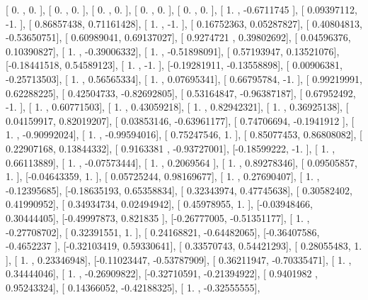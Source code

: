\documentclass{article}
\begin{document}
       [ 0.        ,  0.        ],
       [ 0.        ,  0.        ],
       [ 0.        ,  0.        ],
       [ 0.        ,  0.        ],
       [ 0.        ,  0.        ],
       [ 1.        , -0.6711745 ],
       [ 0.09397112, -1.        ],
       [ 0.86857438,  0.71161428],
       [ 1.        , -1.        ],
       [ 0.16752363,  0.05287827],
       [ 0.40804813, -0.53650751],
       [ 0.60989041,  0.69137027],
       [ 0.9274721 ,  0.39802692],
       [ 0.04596376,  0.10390827],
       [ 1.        , -0.39006332],
       [ 1.        , -0.51898091],
       [ 0.57193947,  0.13521076],
       [-0.18441518,  0.54589123],
       [ 1.        , -1.        ],
       [-0.19281911, -0.13558898],
       [ 0.00906381, -0.25713503],
       [ 1.        ,  0.56565334],
       [ 1.        ,  0.07695341],
       [ 0.66795784, -1.        ],
       [ 0.99219991,  0.62288225],
       [ 0.42504733, -0.82692805],
       [ 0.53164847, -0.96387187],
       [ 0.67952492, -1.        ],
       [ 1.        ,  0.60771503],
       [ 1.        ,  0.43059218],
       [ 1.        ,  0.82942321],
       [ 1.        ,  0.36925138],
       [ 0.04159917,  0.82019207],
       [ 0.03853146, -0.63961177],
       [ 0.74706694, -0.1941912 ],
       [ 1.        , -0.90992024],
       [ 1.        , -0.99594016],
       [ 0.75247546,  1.        ],
       [ 0.85077453,  0.86808082],
       [ 0.22907168,  0.13844332],
       [ 0.9163381 , -0.93727001],
       [-0.18599222, -1.        ],
       [ 1.        ,  0.66113889],
       [ 1.        , -0.07573444],
       [ 1.        ,  0.2069564 ],
       [ 1.        ,  0.89278346],
       [ 0.09505857,  1.        ],
       [-0.04643359,  1.        ],
       [ 0.05725244,  0.98169677],
       [ 1.        ,  0.27690407],
       [ 1.        , -0.12395685],
       [-0.18635193,  0.65358834],
       [ 0.32343974,  0.47745638],
       [ 0.30582402,  0.41990952],
       [ 0.34934734,  0.02494942],
       [ 0.45978955,  1.        ],
       [-0.03948466,  0.30444405],
       [-0.49997873,  0.821835  ],
       [-0.26777005, -0.51351177],
       [ 1.        , -0.27708702],
       [ 0.32391551,  1.        ],
       [ 0.24168821, -0.64482065],
       [-0.36407586, -0.4652237 ],
       [-0.32103419,  0.59330641],
       [ 0.33570743,  0.54421293],
       [ 0.28055483,  1.        ],
       [ 1.        ,  0.23346948],
       [-0.11023447, -0.53787909],
       [ 0.36211947, -0.70335471],
       [ 1.        ,  0.34444046],
       [ 1.        , -0.26909822],
       [-0.32710591, -0.21394922],
       [ 0.9401982 ,  0.95243324],
       [ 0.14366052, -0.42188325],
       [ 1.        , -0.32555555],
\end{document}
